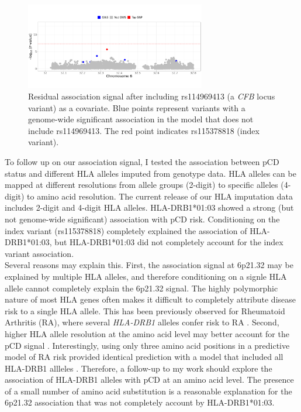 \begin{figure}
  \centering    
  \includegraphics[width=0.7\textwidth]{Vector/cond_mcgovern_regional_assoc_plot}
  \caption[Figure]{Residual association signal after including  rs114969413 (a \textit{CFB} locus variant) as a covariate. Blue points represent variants with a genome-wide significant association in the model that does not include rs114969413. The red point indicates rs115378818 (index variant).}
  \label{fig:cond_mcgovern}
  \end{figure}


To follow up on our association signal, I tested the association between pCD status and different HLA alleles imputed from genotype data. HLA alleles can be mapped at different resolutions from allele groups (2-digit) to specific alleles (4-digit) to amino acid resolution. The current release of our HLA imputation data includes 2-digit and 4-digit HLA alleles. HLA-DRB1*01:03 showed a strong (but not genome-wide significant) association with pCD risk. Conditioning on the index variant (rs115378818) completely explained the association of HLA-DRB1*01:03, but HLA-DRB1*01:03 did not completely account for the index variant association. \\

Several reasons may explain this. First, the association signal at 6p21.32 may be explained by multiple HLA alleles, and therefore conditioning on a signle HLA allele cannot completely explain the 6p21.32 signal. The highly polymorphic nature of most HLA genes often makes it difficult to completely attribute disease risk to a single HLA allele. This has been previously observed for Rheumatoid Arthritis (RA), where several \textit{HLA-DRB1} alleles confer risk to RA \cite{Van_Drongelen2017-dh}. Second, higher HLA allele resolution at the amino acid level may better account for the pCD signal \cite{Molineros2019-mu}. Interestingly, using only three amino acid positions in a predictive model of RA risk provided identical prediction with a model that included all HLA-DRB1 allleles \cite{Raychaudhuri2012-em}. Therefore, a follow-up to my work should explore the association of HLA-DRB1 alleles with pCD at an amino acid level. The presence of a small number of amino acid substitution is a reasonable explanation for the 6p21.32 association that was not completely account by HLA-DRB1*01:03.\\





